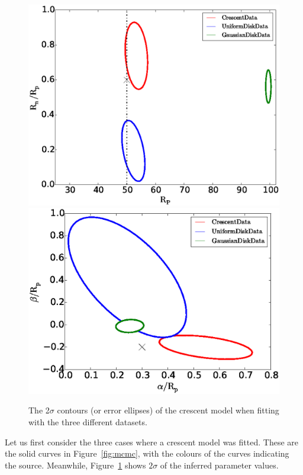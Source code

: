 \documentclass[usenatbib]{mn2e}
\begin{document}
\begin{figure}
\centering
  \includegraphics[width=0.9\hsize]{figures/Rhalf_RnRp.eps}
  \includegraphics[width=0.9\hsize]{figures/aRp_bRp.eps}
\caption{\label{fig:crescentfit} The 2$\sigma$ contours (or error ellipses)
  of the crescent model when fitting with the three different
  datasets.}
\end{figure}

Let us first consider the three cases where a crescent model was
fitted.  These are the solid curves in Figure~\ref{fig:mcmc}, with the
colours of the curves indicating the source.  Meanwhile,
Figure~\ref{fig:crescentfit} shows $2\sigma$ of the inferred parameter
values.
\end{document}
